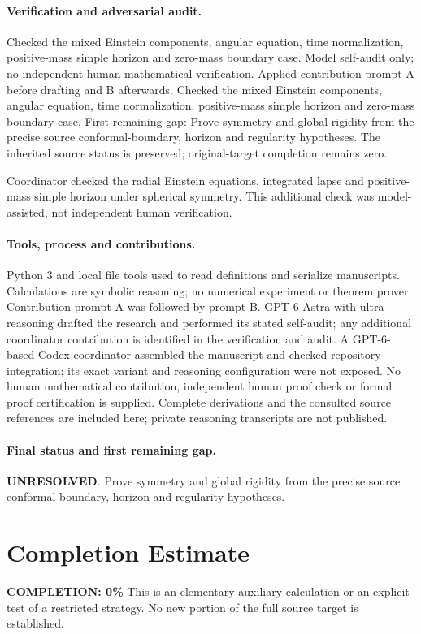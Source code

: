\documentclass[11pt]{article}
\begin{document}
\paragraph{Verification and adversarial audit.}
Checked the mixed Einstein components, angular equation, time normalization, positive-mass simple horizon and zero-mass boundary case. Model self-audit only; no independent human mathematical verification. Applied contribution prompt A before drafting and B afterwards. Checked the mixed Einstein components, angular equation, time normalization, positive-mass simple horizon and zero-mass boundary case. First remaining gap: Prove symmetry and global rigidity from the precise source conformal-boundary, horizon and regularity hypotheses. The inherited source status is preserved; original-target completion remains zero.

Coordinator checked the radial Einstein equations, integrated lapse and positive-mass simple horizon under spherical symmetry. This additional check was model-assisted, not independent human verification.

\paragraph{Tools, process and contributions.}
Python 3 and local file tools used to read definitions and serialize manuscripts. Calculations are symbolic reasoning; no numerical experiment or theorem prover. Contribution prompt A was followed by prompt B. GPT-6 Astra with ultra reasoning drafted the research and performed its stated self-audit; any additional coordinator contribution is identified in the verification and audit. A GPT-6-based Codex coordinator assembled the manuscript and checked repository integration; its exact variant and reasoning configuration were not exposed. No human mathematical contribution, independent human proof check or formal proof certification is supplied. Complete derivations and the consulted source references are included here; private reasoning transcripts are not published.

\paragraph{Final status and first remaining gap.}
\textbf{UNRESOLVED}. Prove symmetry and global rigidity from the precise source conformal-boundary, horizon and regularity hypotheses.

\section{Completion Estimate}
\noindent\textbf{COMPLETION: 0\%}
This is an elementary auxiliary calculation or an explicit test of a restricted strategy. No new portion of the full source target is established.
\end{document}

